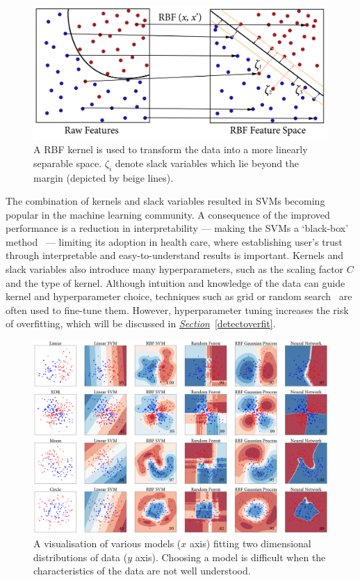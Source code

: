 \documentclass[12pt, twoside]{book}
\begin{document}
\begin{figure}[!htb]
	\centering\includegraphics[width=0.8\linewidth]{svm.png}
	\caption{A RBF kernel is used to transform the data into a more linearly separable space. $\zeta_i$ denote slack variables which lie beyond the margin (depicted by beige lines). }
	\label{svm}
	\vspace{-0.5em}
\end{figure}
The combination of kernels and slack variables resulted in SVMs becoming popular in the machine learning community. A consequence of the improved performance is a reduction in interpretability --- making the SVMs a `black-box' method~\cite{svmblackbox} --- limiting its adoption in health care, where establishing user's trust through interpretable and easy-to-understand results is important. Kernels and slack variables also introduce many hyperparameters, such as the scaling factor $C$ and the type of kernel. Although intuition and knowledge of the data can guide kernel and hyperparameter choice, techniques such as grid or random search~\cite{gridsearch} are often used to fine-tune them. However, hyperparameter tuning increases the risk of overfitting, which will be discussed in \textit{\hyperref[detectoverfit]{Section}}~\ref{detectoverfit}. 

\begin{figure}[!htb]
	\centerline{\centering\includegraphics[width=1.2\linewidth]{model_vis.png}}
	\caption{A visualisation of various models ($x$ axis) fitting two dimensional distributions of data ($y$ axis). Choosing a model is difficult when the characteristics of the data are not well understood.}
	\label{modelvis}
\end{figure}
\end{document}
